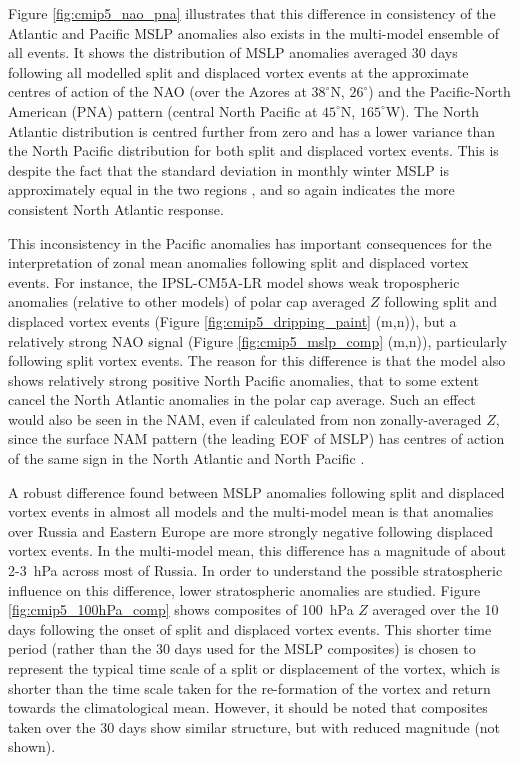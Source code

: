 Figure \ref{fig:cmip5_nao_pna} illustrates that this difference in consistency
of the Atlantic and Pacific MSLP anomalies also exists in the multi-model
ensemble of all events. It shows the distribution of MSLP anomalies averaged 30
days following all modelled split and displaced vortex events at the approximate
centres of action of the NAO (over the Azores at $38^{\circ}$N, $26^{\circ}$)
and the Pacific-North American (PNA) pattern (central North Pacific at
$45^{\circ}$N, $165^{\circ}$W). The North Atlantic distribution is centred
further from zero and has a lower variance than the North Pacific distribution
for both split and displaced vortex events. This is despite the fact that the
standard deviation in monthly winter MSLP is approximately equal in the two
regions \citep{Allan2006}, and so again indicates the more consistent North
Atlantic response.

This inconsistency in the Pacific anomalies has important consequences for the
interpretation of zonal mean anomalies following split and displaced vortex
events. For instance, the IPSL-CM5A-LR model shows weak tropospheric anomalies
(relative to other models) of polar cap averaged $Z$ following split and
displaced vortex events (Figure \ref{fig:cmip5_dripping_paint} (m,n)), but a
relatively strong NAO signal (Figure \ref{fig:cmip5_mslp_comp} (m,n)),
particularly following split vortex events. The reason for this difference is
that the model also shows relatively strong positive North Pacific anomalies,
that to some extent cancel the North Atlantic anomalies in the polar cap
average. Such an effect would also be seen in the NAM, even if calculated from
non zonally-averaged $Z$, since the surface NAM pattern (the leading EOF of
MSLP) has centres of action of the same sign in the North Atlantic and North
Pacific \citep[e.g.,][]{Ambaum2001}.

A robust difference found between MSLP anomalies following split and displaced
vortex events in almost all models and the multi-model mean is that anomalies
over Russia and Eastern Europe are more strongly negative following displaced
vortex events. In the multi-model mean, this difference has a magnitude of about
2-3~hPa across most of Russia. In order to understand the possible stratospheric
influence on this difference, lower stratospheric anomalies are studied. Figure
\ref{fig:cmip5_100hPa_comp} shows composites of 100~hPa $Z$ averaged over the 10
days following the onset of split and displaced vortex events. This shorter time
period (rather than the 30 days used for the MSLP composites) is chosen to
represent the typical time scale of a split or displacement of the vortex, which
is shorter than the time scale taken for the re-formation of the vortex and
return towards the climatological mean. However, it should be noted that
composites taken over the 30 days show similar structure, but with reduced
magnitude (not shown). 

